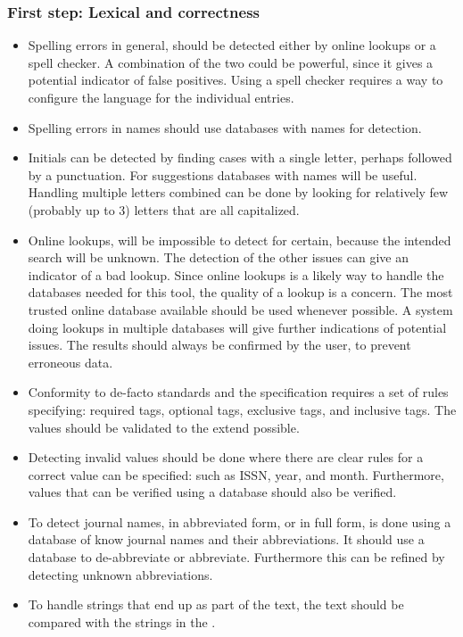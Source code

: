 \subsubsection{First step: Lexical and correctness}
\begin{itemize}
\item Spelling errors in general, should be detected either by online
  lookups or a spell checker.  A combination of the two could be
  powerful, since it gives a potential indicator of false positives.
  Using a spell checker requires a way to configure the language for
  the individual entries.

\item Spelling errors in names should use databases with
  names for detection.

\item Initials can be detected by finding cases with a single letter,
  perhaps followed by a punctuation.  For suggestions databases with
  names will be useful.  Handling multiple letters combined can be
  done by looking for relatively few (probably up to 3) letters that
  are all capitalized.

\item Online lookups, will be impossible to detect for certain,
  because the intended search will be unknown.  The detection of the
  other issues can give an indicator of a bad lookup.  Since online
  lookups is a likely way to handle the databases needed for this
  tool, the quality of a lookup is a concern.  The most trusted online
  database available should be used whenever possible.  A system doing
  lookups in multiple databases will give further indications of
  potential issues.  The results should always be confirmed by the
  user, to prevent erroneous data.

\item Conformity to de-facto standards and the {\bibtex} specification
  requires a set of rules specifying: required tags, optional tags,
  exclusive tags, and inclusive tags.  The values should be validated
  to the extend possible.

\item Detecting invalid values should be done where there are clear
  rules for a correct value can be specified: such as ISSN, year, and
  month.  Furthermore, values that can be verified using a database
  should also be verified.

\item To detect journal names, in abbreviated form, or in full form,
  is done using a database of know journal names and their
  abbreviations.  It should use a database to de-abbreviate or
  abbreviate.  Furthermore this can be refined by detecting unknown
  abbreviations.

\item To handle {\bibtex} strings that end up as part of the text, the
  text should be compared with the strings in the .
\end{itemize}


